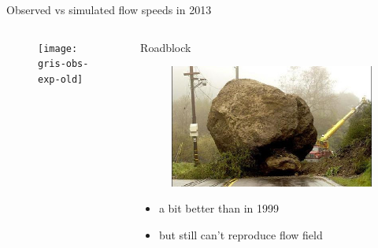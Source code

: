\documentclass[hide notes,intlimits]{beamer}
\begin{document}
\begin{frame}{Observed vs simulated flow speeds in 2013}
  \begin{columns}[c]
    \begin{column}{.65\linewidth}
      \begin{figure}
        \texttt{[image: gris-obs-exp-old]}
      \end{figure}
    \end{column}
    \begin{column}{.35\linewidth}
      \begin{block}{Roadblock}
        \begin{figure}
          \includegraphics[width=\textwidth]{roadblocks}
        \end{figure}
        \begin{itemize}
        \item a bit better than in 1999
        \item but still can't reproduce flow field
        \end{itemize}
      \end{block}
    \end{column}
  \end{columns}
\end{frame}
\end{document}

